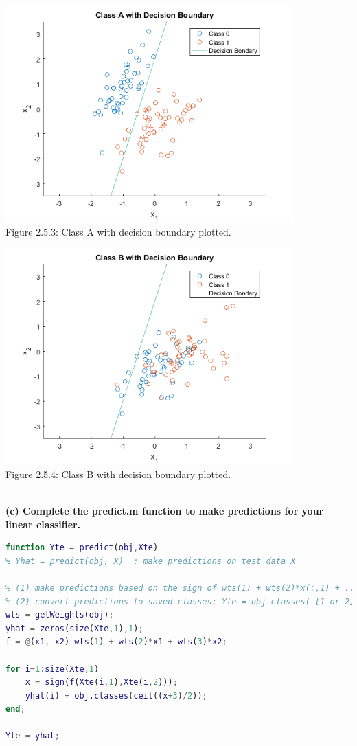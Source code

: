 \documentclass[]{report}   %
\begin{document}
\begin{center}
	\includegraphics[width=30em,keepaspectratio]{2_5_Figure_3.png}\\
	{Figure 2.5.3: Class A with decision boundary plotted.}
\end{center} 
\begin{center}
	\includegraphics[width=30em,keepaspectratio]{2_5_Figure_4.png}\\
	{Figure 2.5.4: Class B with decision boundary plotted.}
\end{center} 
~\\
{\bf (c) Complete the predict.m function to make predictions for your linear classifier.}
\begin{lstlisting}[language=Matlab, caption=predict() Implementation]
function Yte = predict(obj,Xte)
% Yhat = predict(obj, X)  : make predictions on test data X

% (1) make predictions based on the sign of wts(1) + wts(2)*x(:,1) + ...
% (2) convert predictions to saved classes: Yte = obj.classes( [1 or 2] );
wts = getWeights(obj);
yhat = zeros(size(Xte,1),1);
f = @(x1, x2) wts(1) + wts(2)*x1 + wts(3)*x2;

for i=1:size(Xte,1)
    x = sign(f(Xte(i,1),Xte(i,2)));
    yhat(i) = obj.classes(ceil((x+3)/2));
end;

Yte = yhat;
\end{lstlisting}
\end{document}
